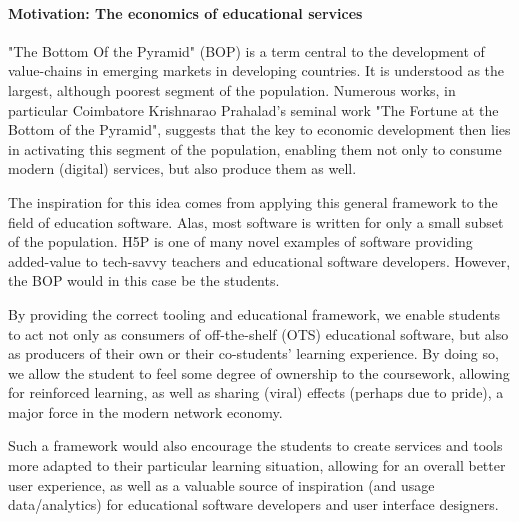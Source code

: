 \paragraph{Motivation: The economics of educational services}

"The Bottom Of the Pyramid" (BOP) is a term central to the development of
value-chains in emerging markets in developing countries. It is understood as
the largest, although poorest segment of the population. Numerous works, in
particular Coimbatore Krishnarao Prahalad's seminal work "The Fortune at the
Bottom of the Pyramid", suggests that the key to economic development then lies
in activating this segment of the population, enabling them not only to consume
modern (digital) services, but also produce them as well.

The inspiration for this idea comes from applying this general framework to the
field of education software. Alas, most software is written for only a small
subset of the population. H5P is one of many novel examples of software
providing added-value to tech-savvy teachers and educational software
developers. However, the BOP would in this case be the students.

By providing the correct tooling and educational framework, we enable students
to act not only as consumers of off-the-shelf (OTS) educational software, but
also as producers of their own or their co-students' learning experience. By
doing so, we allow the student to feel some degree of ownership to the
coursework, allowing for reinforced learning, as well as sharing (viral) effects
(perhaps due to pride), a major force in the modern network economy.

Such a framework would also encourage the students to create services and tools
more adapted to their particular learning situation, allowing for an overall
better user experience, as well as a valuable source of inspiration (and usage
data/analytics) for educational software developers and user interface
designers.
